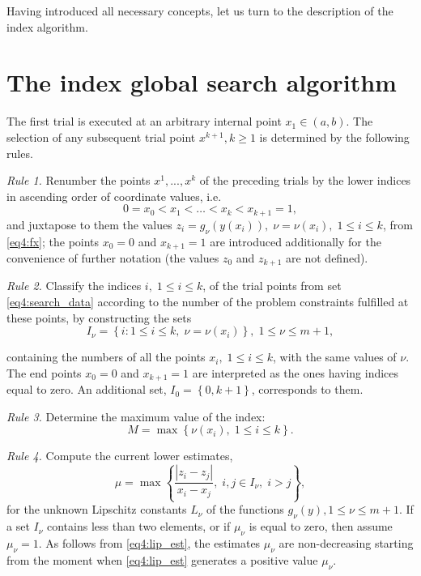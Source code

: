 \documentclass[graybox]{svmult}
\begin{document}
Having introduced all necessary concepts, let us turn to the description of the index algorithm.

\section{The index global search algorithm}
The first trial is executed at an arbitrary internal point $x_1\in(a,b)$. The selection of any subsequent trial point $x^{k+1},k\ge 1$ is determined by the following rules.

\emph{Rule 1.} Renumber the points $x^1,...,x^k$ of the preceding trials by the lower indices in ascending order of coordinate values, i.e.
\begin{equation}
  \label{eq4:search_data}
  0=x_0<x_1<\dots <x_k<x_{k+1}=1,
\end{equation}
and juxtapose to them the values $z_i=g_\nu(y(x_i)), \; \nu=\nu(x_i), \; 1
\leq i \leq k$, from \eqref{eq4:fx}; the points $x_0=0$ and
$x_{k+1}=1$ are introduced additionally for the convenience  of further notation (the values $z_0$ and $z_{k+1}$ are not defined).

\emph{Rule 2.} Classify the indices $i, \; 1 \leq i \leq k$, of the trial points from set \eqref{eq4:search_data} according to the number of the problem constraints fulfilled at these points, by constructing the sets
\begin{equation}
  I_\nu =\left\{i:1 \leq i \leq k, \; \nu=\nu(x_i) \right\}, \; 1 \leq \nu \leq m+1,
\end{equation}

containing the numbers of all the points $x_i, \; 1 \leq i \leq k$, with
the same values of $\nu$. The end points $x_0=0$ and $x_{k+1}=1$ are
interpreted as the ones having indices equal to zero. An additional set,
$I_0=\left\{0,k+1\right\}$, corresponds to them.

\emph{Rule 3.} Determine the maximum value of the index:
\begin{equation}
  M=\max\left\{\nu(x_i), \; 1 \leq i \leq k \right \}.
\end{equation}

\emph{Rule 4.} Compute the current lower estimates,
\begin{equation}
  \label{eq4:lip_est}
  \mu = \max\left\{ \frac{\left|z_i-z_j\right|}{ x_i - x_j }, \; i,j \in I_\nu, \; i>j \right\},
\end{equation}
for the unknown Lipschitz constants $L_\nu$ of the functions $g_\nu(y),1
\leq \nu \leq m+1$. If a set $I_\nu$ contains less than two elements, or
if $\mu_\nu$ is equal to zero, then assume $\mu_\nu=1$. As follows from \eqref{eq4:lip_est}, the estimates $\mu_\nu$ are non-decreasing starting from the moment when \eqref{eq4:lip_est} generates a positive value $\mu_\nu$.
\end{document}
